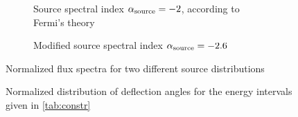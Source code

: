 \begin{landscape}

\begin{figure}[t]
    \begin{subfigure}[t]{\textwidth}
        \centering
        
        \caption{Source spectral index $\alpha_{\mathrm{source}}=-2$, according to Fermi's theory}
        \label{fig:constraints-fermi}
        \vspace*{\baselineskip}
    \end{subfigure}

    \begin{subfigure}[t]{\textwidth}
        \centering
        
        \caption{Modified source spectral index $\alpha_{\mathrm{source}}=-2.6$}
        \label{fig:constraints-mod}
    \end{subfigure}
    \caption{Normalized flux spectra for two different source distributions}
    \label{fig:constraints}
\end{figure}

\begin{figure}[p]
    \centering
    
    \caption{Normalized distribution of deflection angles for the energy
        intervals given in \cref{tab:constr}}
    \label{fig:constrains-defl}
\end{figure}


\end{landscape}
